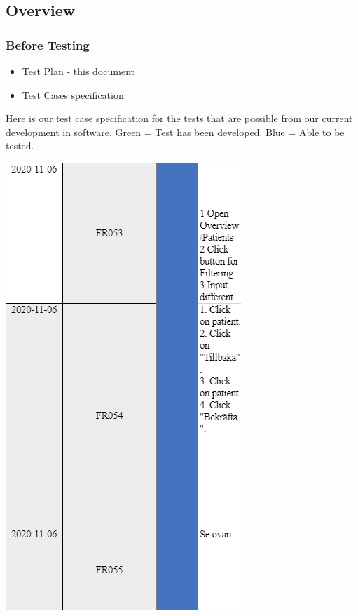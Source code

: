 \subsection{Overview}
\subsubsection{Before Testing}
\begin{itemize}
    \item Test Plan - this document
    \item{Test Cases specification}
\end{itemize}
Here is our test case specification for the tests that are possible from our current development in software. Green = Test has been developed. Blue = Able to be tested.

\vfill
\includegraphics[]{Pictures/TestCase1.PNG}
\vfill

